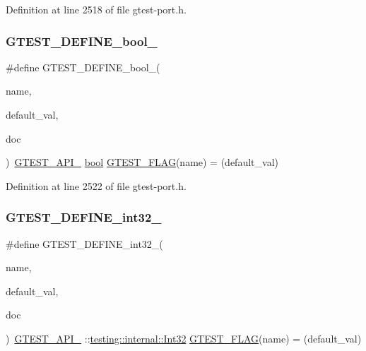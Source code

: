 Definition at line 2518 of file gtest-\/port.\+h.

\mbox{\label{gtest-port_8h_a48e05814779e5a2f432b06a12618a760}} 
\subsubsection{\texorpdfstring{G\+T\+E\+S\+T\+\_\+\+D\+E\+F\+I\+N\+E\+\_\+bool\+\_\+}{GTEST\_DEFINE\_bool\_}}
{\footnotesize\ttfamily \#define G\+T\+E\+S\+T\+\_\+\+D\+E\+F\+I\+N\+E\+\_\+bool\+\_\+(\begin{DoxyParamCaption}\item[{}]{name,  }\item[{}]{default\+\_\+val,  }\item[{}]{doc }\end{DoxyParamCaption})~\hyperlink{gtest-port_8h_aa73be6f0ba4a7456180a94904ce17790}{G\+T\+E\+S\+T\+\_\+\+A\+P\+I\+\_\+} \hyperlink{classbool}{bool} \hyperlink{gtest-port_8h_a828f4e34a1c4b510da50ec1563e3562a}{G\+T\+E\+S\+T\+\_\+\+F\+L\+AG}(name) = (default\+\_\+val)}



Definition at line 2522 of file gtest-\/port.\+h.

\mbox{\label{gtest-port_8h_a88ee2f19589ffff86ca742fd33611358}} 
\subsubsection{\texorpdfstring{G\+T\+E\+S\+T\+\_\+\+D\+E\+F\+I\+N\+E\+\_\+int32\+\_\+}{GTEST\_DEFINE\_int32\_}}
{\footnotesize\ttfamily \#define G\+T\+E\+S\+T\+\_\+\+D\+E\+F\+I\+N\+E\+\_\+int32\+\_\+(\begin{DoxyParamCaption}\item[{}]{name,  }\item[{}]{default\+\_\+val,  }\item[{}]{doc }\end{DoxyParamCaption})~\hyperlink{gtest-port_8h_aa73be6f0ba4a7456180a94904ce17790}{G\+T\+E\+S\+T\+\_\+\+A\+P\+I\+\_\+} \+::\hyperlink{namespacetesting_1_1internal_a8ee38faaf875f133358abaf9bc056cec}{testing\+::internal\+::\+Int32} \hyperlink{gtest-port_8h_a828f4e34a1c4b510da50ec1563e3562a}{G\+T\+E\+S\+T\+\_\+\+F\+L\+AG}(name) = (default\+\_\+val)}



